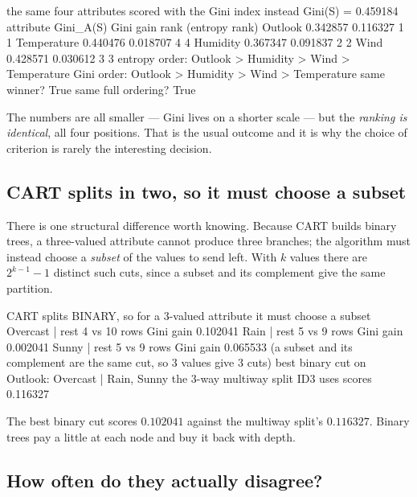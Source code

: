 \documentclass[11pt]{article}
\begin{document}
\begin{codeout}
the same four attributes scored with the Gini index instead
Gini(S) = 0.459184
attribute      Gini_A(S)   Gini gain  rank   (entropy rank)
Outlook        0.342857    0.116327    1          1
Temperature    0.440476    0.018707    4          4
Humidity       0.367347    0.091837    2          2
Wind           0.428571    0.030612    3          3
entropy order: Outlook > Humidity > Wind > Temperature
Gini    order: Outlook > Humidity > Wind > Temperature
same winner? True      same full ordering? True
\end{codeout}

The numbers are all smaller --- Gini lives on a shorter scale --- but the
\emph{ranking is identical}, all four positions. That is the usual outcome and
it is why the choice of criterion is rarely the interesting decision.

\subsection{CART splits in two, so it must choose a subset}

There is one structural difference worth knowing. Because CART builds binary
trees, a three-valued attribute cannot produce three branches; the algorithm
must instead choose a \emph{subset} of the values to send left. With $k$
values there are $2^{k-1}-1$ distinct such cuts, since a subset and its
complement give the same partition.

\begin{codeout}
CART splits BINARY, so for a 3-valued attribute it must choose a subset
   {Overcast        } | rest    4 vs 10 rows   Gini gain 0.102041
   {Rain            } | rest    5 vs  9 rows   Gini gain 0.002041
   {Sunny           } | rest    5 vs  9 rows   Gini gain 0.065533
   (a subset and its complement are the same cut, so 3 values give 3 cuts)
   best binary cut on Outlook: {Overcast} | {Rain, Sunny}
   the 3-way multiway split ID3 uses scores 0.116327
\end{codeout}

The best binary cut scores $0.102041$ against the multiway split's $0.116327$.
Binary trees pay a little at each node and buy it back with depth.

\subsection{How often do they actually disagree?}
\end{document}
